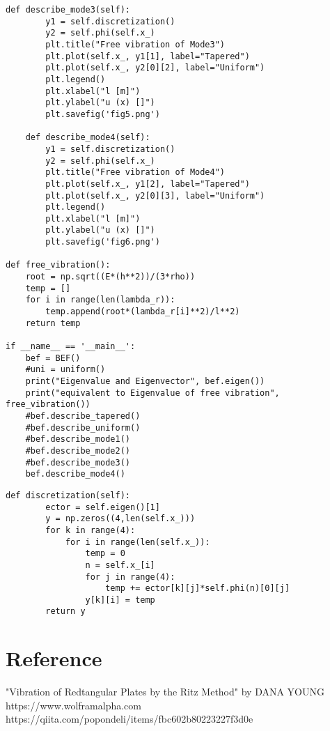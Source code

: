 \documentclass[12pt]{jsarticle}
\begin{document}
\begin{lstlisting}[caption=trapezoid.py,label=fuga]
    def describe_mode3(self):
        y1 = self.discretization()
        y2 = self.phi(self.x_)
        plt.title("Free vibration of Mode3")
        plt.plot(self.x_, y1[1], label="Tapered")
        plt.plot(self.x_, y2[0][2], label="Uniform")
        plt.legend()
        plt.xlabel("l [m]")
        plt.ylabel("u (x) []")
        plt.savefig('fig5.png')
        
    def describe_mode4(self):
        y1 = self.discretization()
        y2 = self.phi(self.x_)
        plt.title("Free vibration of Mode4")
        plt.plot(self.x_, y1[2], label="Tapered")
        plt.plot(self.x_, y2[0][3], label="Uniform")
        plt.legend()
        plt.xlabel("l [m]")
        plt.ylabel("u (x) []")
        plt.savefig('fig6.png')

def free_vibration():
    root = np.sqrt((E*(h**2))/(3*rho))
    temp = []
    for i in range(len(lambda_r)):
        temp.append(root*(lambda_r[i]**2)/l**2)
    return temp

if __name__ == '__main__':
    bef = BEF()
    #uni = uniform()
    print("Eigenvalue and Eigenvector", bef.eigen())
    print("equivalent to Eigenvalue of free vibration", free_vibration())
    #bef.describe_tapered()
    #bef.describe_uniform()
    #bef.describe_mode1()
    #bef.describe_mode2()
    #bef.describe_mode3()
    bef.describe_mode4()
\end{lstlisting}
\begin{lstlisting}[caption=Simpson.py,label=fuga]
    def discretization(self):
        ector = self.eigen()[1]
        y = np.zeros((4,len(self.x_)))
        for k in range(4):
            for i in range(len(self.x_)):
                temp = 0
                n = self.x_[i]
                for j in range(4):
                    temp += ector[k][j]*self.phi(n)[0][j]
                y[k][i] = temp
        return y        
\end{lstlisting}
\section*{Reference} \noindent
[1] "Vibration of Redtangular Plates by the Ritz Method" by DANA YOUNG \newline
[2] https://www.wolframalpha.com \newline
[3] https://qiita.com/popondeli/items/fbc602b80223227f3d0e
\end{document}
